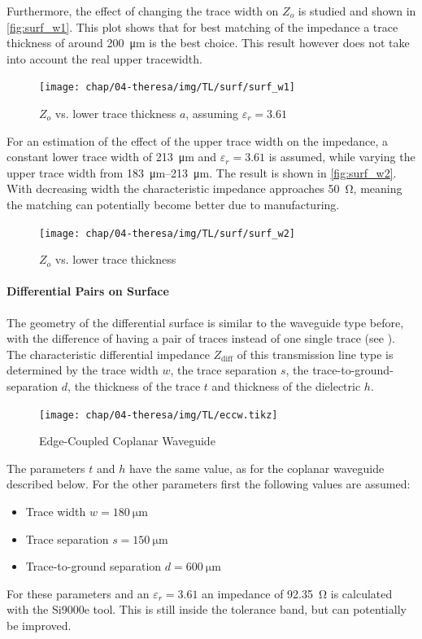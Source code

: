 Furthermore, the effect of changing the trace width on $Z_o$ is studied and shown in \autoref{fig:surf_w1}.
This plot shows that for best matching of the impedance a trace thickness of around \SI{200}{\micro \meter} is the best choice.
This result however does not take into account the real upper tracewidth.
\begin{figure}[tbh]
	\centering
	\texttt{[image: chap/04-theresa/img/TL/surf/surf\_w1]}
	\caption[CWG, $Z_o$ vs. $a$]{$Z_o$ vs. lower trace thickness $a$, assuming $\varepsilon_r = 3.61$}
	\label{fig:surf_w1}
\end{figure}

For an estimation of the effect of the upper trace width on the impedance, a constant lower trace width of \SI{213}{\micro \meter} and $\varepsilon_r = 3.61$ is assumed, while varying the upper trace width from \SIrange{183}{213}{\micro \meter}.
The result is shown in \autoref{fig:surf_w2}.
With decreasing width the characteristic impedance approaches \SI{50}{\ohm}, meaning the matching can potentially become better due to manufacturing.
\begin{figure}[tbh]
	\centering
	\texttt{[image: chap/04-theresa/img/TL/surf/surf\_w2]}
	\caption{$Z_o$ vs. lower trace thickness}
	\label{fig:surf_w2}
\end{figure}


\paragraph{Differential Pairs on Surface}
The geometry of the differential surface is similar to the waveguide type before, with the difference of having a pair of traces instead of one single trace (see ).
The characteristic differential impedance $Z_\text{diff}$ of this transmission line type is determined by the trace width $w$, the trace separation $s$, the trace-to-ground-separation $d$, the thickness of the trace $t$ and thickness of the dielectric $h$.

\begin{figure}[tbh]
	\centering
	\texttt{[image: chap/04-theresa/img/TL/eccw.tikz]}
	\caption{Edge-Coupled Coplanar Waveguide}
	\label{fig:eccw_geometry}
\end{figure}

The parameters $t$ and $h$ have the same value, as for the coplanar waveguide described below.
For the other parameters first the following values are assumed:
\begin{itemize}
	\item Trace width $w = \SI{180}{\micro \meter}$ 
	\item Trace separation $s = \SI{150}{\micro \meter}$
	\item Trace-to-ground separation $d = \SI{600}{\micro \meter}$
\end{itemize}
For these parameters and an $\varepsilon_r = 3.61$ an impedance of \SI{92.35}{\ohm} is calculated with the Si9000e tool.
This is still inside the tolerance band, but can potentially be improved.

